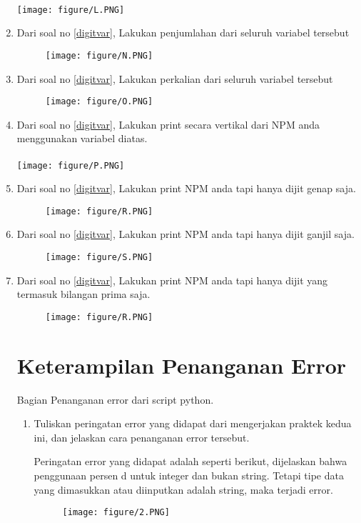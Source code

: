 \documentclass{article}
\begin{document}
\begin{enumerate}
\paragraph{}
\centerline{\texttt{[image: figure/L.PNG]}}
\newpage\item
Dari soal no \ref{digitvar}, Lakukan penjumlahan dari seluruh variabel tersebut
\begin{figure}[h]
\centerline{\texttt{[image: figure/N.PNG]}}
\end{figure}

\item 
Dari soal no \ref{digitvar}, Lakukan perkalian dari seluruh variabel tersebut
\begin{figure}[h]
\centerline{\texttt{[image: figure/O.PNG]}}
\end{figure}

\item
Dari soal no \ref{digitvar}, Lakukan print secara vertikal dari NPM anda menggunakan variabel diatas. 
\paragraph{}
\centerline{\texttt{[image: figure/P.PNG]}}

\item
Dari soal no \ref{digitvar}, Lakukan print NPM anda tapi hanya dijit genap saja. 
\begin{figure}[h]
\centerline{\texttt{[image: figure/R.PNG]}}
\end{figure}
\item
Dari soal no \ref{digitvar}, Lakukan print NPM anda tapi hanya dijit ganjil saja.
\begin{figure}[h]
\centerline{\texttt{[image: figure/S.PNG]}}
\end{figure}
\newpage\item 
Dari soal no \ref{digitvar}, Lakukan print NPM anda tapi hanya dijit yang termasuk bilangan prima saja.
\begin{figure}[h]
\centerline{\texttt{[image: figure/R.PNG]}}
\end{figure}
\section{Keterampilan Penanganan Error}
Bagian Penanganan error dari script python.
\begin{enumerate}
\item
Tuliskan peringatan error yang didapat dari mengerjakan praktek kedua ini, dan jelaskan cara penanganan error tersebut.
\par Peringatan error yang didapat adalah seperti berikut, dijelaskan bahwa penggunaan persen d untuk integer dan bukan string. Tetapi tipe data yang dimasukkan atau diinputkan adalah string, maka terjadi error.
\begin{figure}[h]
\newpage\centerline{\texttt{[image: figure/2.PNG]}}
\end{figure}


\end{enumerate}
\end{enumerate}
\end{document}
